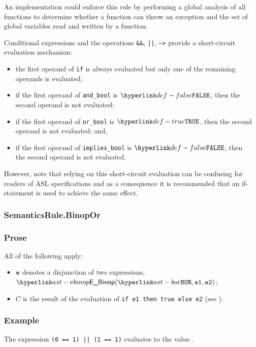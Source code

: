 
An implementation could enforce this rule by performing a global analysis of
all functions to determine whether a function can throw an exception and the
set of global variables read and written by a function.

Conditional expressions and the operations \texttt{\&\&}, \texttt{||},
\texttt{-->} provide a short-circuit evaluation mechanism:

\begin{itemize}
\item the first operand of \texttt{if} is always evaluated but only one of the
remaining operands is evaluated;
\item if the first operand of \texttt{and\_bool} is $\False$, then the second operand is not evaluated;
\item if the first operand of \texttt{or\_bool} is $\True$, then the second operand is not evaluated; and,
\item if the first operand of \texttt{implies\_bool} is $\False$, then the
second operand is not evaluated.
\end{itemize}

However, note that relying on this short-circuit evaluation can be confusing
for readers of ASL specifications and as a consequence it is recommended that
an if-statement is used to achieve the same effect.

\subsubsection{SemanticsRule.BinopOr \label{sec:SemanticsRule.BinopOr}}
\subsubsection{Prose}
All of the following apply:
\begin{itemize}
\item $\texttt{e}$ denotes a disjunction of two expressions, $\EBinop(\BOR, \veone, \vetwo)$;
\item $C$ is the result of the evaluation of
      \texttt{if e1 then true else e2} (see ).
\end{itemize}

\subsubsection{Example}
The expression \texttt{(0 == 1) || (1 == 1)} evaluates to the value \True.

